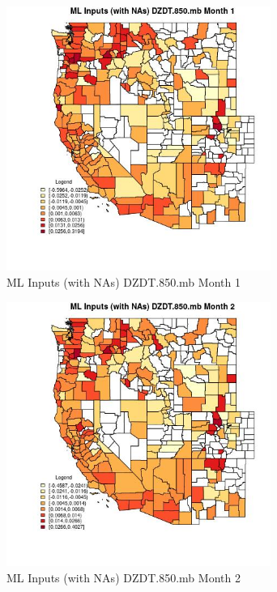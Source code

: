 \begin{figure} 
\centering  
\includegraphics[width=0.77\textwidth]{Code_Outputs/Report_ML_input_PM25_Step4_part_e_de_duplicated_aves_compiled_2019-05-21wNAs_CountyDZDT850mbmedianMonth1.jpg} 
\caption{\label{fig:Report_ML_input_PM25_Step4_part_e_de_duplicated_aves_compiled_2019-05-21wNAsCountyDZDT850mbmedianMonth1}ML Inputs (with NAs) DZDT.850.mb Month 1} 
\end{figure} 
 

\begin{figure} 
\centering  
\includegraphics[width=0.77\textwidth]{Code_Outputs/Report_ML_input_PM25_Step4_part_e_de_duplicated_aves_compiled_2019-05-21wNAs_CountyDZDT850mbmedianMonth2.jpg} 
\caption{\label{fig:Report_ML_input_PM25_Step4_part_e_de_duplicated_aves_compiled_2019-05-21wNAsCountyDZDT850mbmedianMonth2}ML Inputs (with NAs) DZDT.850.mb Month 2} 
\end{figure} 
 

